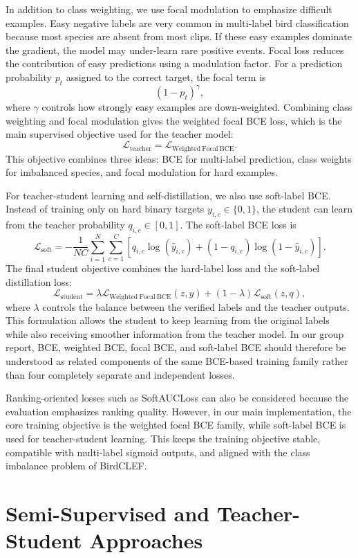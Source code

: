 \documentclass[a4paper,12pt]{article}
\begin{document}
In addition to class weighting, we use focal modulation to emphasize difficult examples. Easy negative labels are very common in multi-label bird classification because most species are absent from most clips. If these easy examples dominate the gradient, the model may under-learn rare positive events. Focal loss reduces the contribution of easy predictions using a modulation factor. For a prediction probability $p_t$ assigned to the correct target, the focal term is
\[
(1-p_t)^\gamma,
\]
where $\gamma$ controls how strongly easy examples are down-weighted. Combining class weighting and focal modulation gives the weighted focal BCE loss, which is the main supervised objective used for the teacher model:
\[
\mathcal{L}_{\mathrm{teacher}}
= \mathcal{L}_{\mathrm{Weighted\ Focal\ BCE}}.
\]
This objective combines three ideas: BCE for multi-label prediction, class weights for imbalanced species, and focal modulation for hard examples.

For teacher-student learning and self-distillation, we also use soft-label BCE. Instead of training only on hard binary targets $y_{i,c}\in\{0,1\}$, the student can learn from the teacher probability $q_{i,c}\in[0,1]$. The soft-label BCE loss is
\[
\mathcal{L}_{\mathrm{soft}}
= -\frac{1}{NC}\sum_{i=1}^{N}\sum_{c=1}^{C}
\left[q_{i,c}\log(\hat{y}_{i,c})+(1-q_{i,c})\log(1-\hat{y}_{i,c})\right].
\]
The final student objective combines the hard-label loss and the soft-label distillation loss:
\[
\mathcal{L}_{\mathrm{student}}
= \lambda \mathcal{L}_{\mathrm{Weighted\ Focal\ BCE}}(z,y)
+ (1-\lambda)\mathcal{L}_{\mathrm{soft}}(z,q),
\]
where $\lambda$ controls the balance between the verified labels and the teacher outputs. This formulation allows the student to keep learning from the original labels while also receiving smoother information from the teacher model. In our group report, BCE, weighted BCE, focal BCE, and soft-label BCE should therefore be understood as related components of the same BCE-based training family rather than four completely separate and independent losses.

Ranking-oriented losses such as SoftAUCLoss can also be considered because the evaluation emphasizes ranking quality. However, in our main implementation, the core training objective is the weighted focal BCE family, while soft-label BCE is used for teacher-student learning. This keeps the training objective stable, compatible with multi-label sigmoid outputs, and aligned with the class imbalance problem of BirdCLEF.

\section{Semi-Supervised and Teacher-Student Approaches}
\label{sec:semi-supervised-learning}
\end{document}
